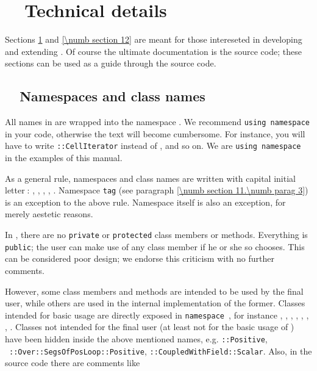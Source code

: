 
\chapter{~~Technical details}\label{\numb section 11}

Sections \ref{\numb section 11} and \ref{\numb section 12} are meant for those intereseted
in developing and extending \maniFEM.
Of course the ultimate documentation is the source code; these sections can be used as
a guide through the source code.


\section{~~Namespaces and class names}\label{\numb section 11.\numb parag 1}

All names in {\maniFEM} are wrapped into the namespace {\small\tt{}}.
We recommend {\small\tt using namespace } in your code,
otherwise the text will become cumbersome.
For instance, you will have to write {\small\tt{}::CellIterator} instead of
{\small\tt{}}, and so on.
We are {\small\tt using namespace } in the examples of this manual.

As a general rule, namespaces and class names are written with capital initial
letter$\;$:
{\small\tt{}}, {\small\tt{}}, {\small\tt{}},
{\small\tt{}}, {\small\tt{}}.
Namespace {\small\tt\textcolor{tag}{tag}} (see paragraph \ref{\numb section 11.\numb parag 3})
is an exception to the above rule.
Namespace {\small\tt{}} itself is also an exception, for merely aestetic reasons.

In \maniFEM, there are no {\small\tt private} or {\small\tt protected} class members or methods.
Everything is {\small\tt public};
the user can make use of any class member if he or she so chooses.
This can be considered poor design; we endorse this criticism with no further comments.

However, some class members and methods are intended to be used by the final user,
while others are used in the internal implementation of the former.
Classes \hbox{intended} for basic usage are directly exposed in {\small\tt namespace
}, for instance
{\small\tt{}}, {\small\tt{}}, {\small\tt{}},
{\small\tt{}}, {\small\tt{}}, {\small\tt{}},
{\small\tt{}}, {\small\tt{}}.
Classes not intended for the final user (at least not for the basic usage of \maniFEM)
have been hidden inside the above mentioned names, e.g. {\small\tt{}::Positive},
\ {\small\tt{}::Over::SegsOfPosLoop::Positive},
\hbox{\small\tt{}::CoupledWithField::Scalar}.
Also, in the source code there are comments like


